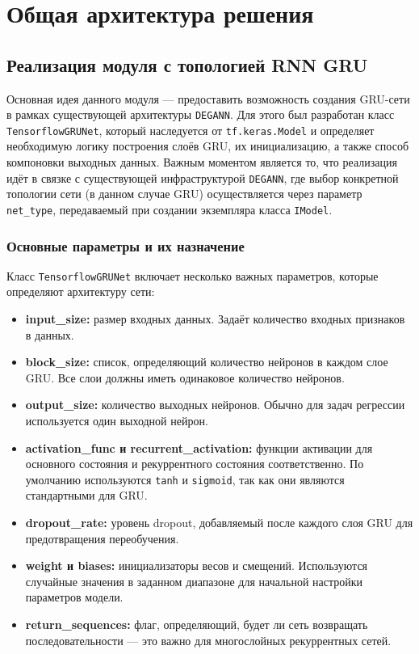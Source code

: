 
\section{Общая архитектура решения}

\subsection{Реализация модуля с топологией RNN GRU}
\label{subsec:topology}


Основная идея данного модуля --- предоставить возможность создания GRU-сети в рамках существующей архитектуры \texttt{DEGANN}. Для этого был разработан класс \texttt{TensorflowGRUNet}, который наследуется от \texttt{tf.keras.Model}\cite{tensorflowDoc} и определяет необходимую логику построения слоёв GRU, их инициализацию, а также способ компоновки выходных данных. Важным моментом является то, что реализация идёт в связке с существующей инфраструктурой \texttt{DEGANN}, где выбор конкретной топологии сети (в данном случае GRU) осуществляется через параметр \texttt{net\_type}, передаваемый при создании экземпляра класса \texttt{IModel}.

\subsubsection{Основные параметры и их назначение}
Класс \texttt{TensorflowGRUNet} включает несколько важных параметров, которые определяют архитектуру сети:
\begin{itemize}
    \item \textbf{input\_size:} размер входных данных. Задаёт количество входных признаков в данных.
    \item \textbf{block\_size:} список, определяющий количество нейронов в каждом слое GRU. Все слои должны иметь одинаковое количество нейронов.
    \item \textbf{output\_size:} количество выходных нейронов. Обычно для задач регрессии используется один выходной нейрон.
    \item \textbf{activation\_func и recurrent\_activation:} функции активации для основного состояния и рекуррентного состояния соответственно. По умолчанию используются \texttt{tanh} и \texttt{sigmoid}, так как они являются стандартными для GRU.
    \item \textbf{dropout\_rate:} уровень dropout, добавляемый после каждого слоя GRU для предотвращения переобучения.
    \item \textbf{weight и biases:} инициализаторы весов и смещений. Используются случайные значения в заданном диапазоне для начальной настройки параметров модели.
    \item \textbf{return\_sequences:} флаг, определяющий, будет ли сеть возвращать последовательности — это важно для многослойных рекуррентных сетей.
\end{itemize}

